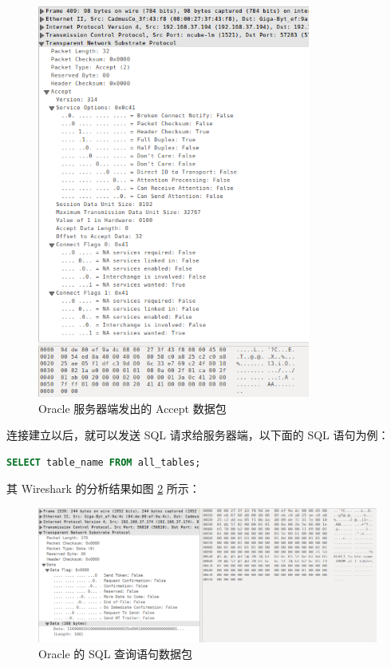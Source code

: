 \begin{figure}[h!]
    \caption{Oracle 服务器端发出的 Accept 数据包}
    \label{fig:tns-accept}
    \centering
    \includegraphics[width=0.8\textwidth]{tns-accept.png}
\end{figure}

连接建立以后，就可以发送 SQL 请求给服务器端，以下面的 SQL 语句为例：

\begin{lstlisting}[language=sql]
SELECT table_name FROM all_tables;
\end{lstlisting}

其 Wireshark 的分析结果如图 \ref{fig:tns-select} 所示：

\begin{figure}[h!]
    \caption{Oracle 的 SQL 查询语句数据包}
    \label{fig:tns-select}
    \centering
    \includegraphics[width=\textwidth]{tns-select2.png}
\end{figure}

